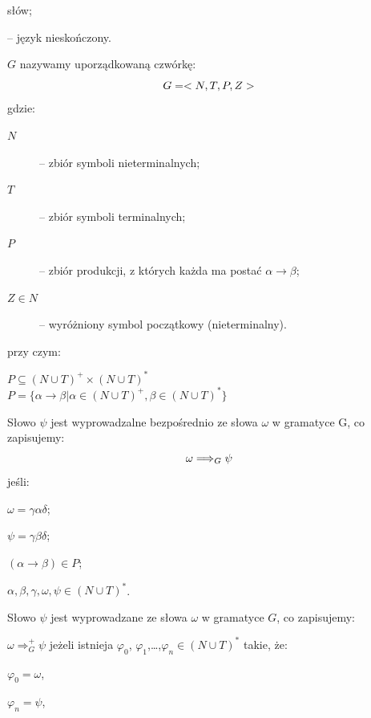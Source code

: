 \begin{description}
\begin{description}
  słów;
   \item[$L_4 = \{0, 01, 011, \ldots\} = \{01^n | n \ge 0\}$]-- język
  nieskończony.
  \end{description}
 \item[Gramatyka] $G$ nazywamy uporządkowaną czwórkę:
  \begin{equation}
  G = <N, T, P, Z>
  \vspace{-10pt}
  \end{equation}
 gdzie:
  \begin{description}
   \item[$N$]-- zbiór symboli nieterminalnych;
   \item[$T$]-- zbiór symboli terminalnych;
   \item[$P$]-- zbiór produkcji, z których każda ma postać
  $\alpha\rightarrow\beta$;
   \item[$Z\in N$]-- wyróżniony symbol początkowy (nieterminalny).
  \end{description}
 przy czym:
  \begin{description}
   \item[$P\subseteq (N\cup T)^+\times(N\cup T)^*$]
   \item[$P=\{\alpha\rightarrow\beta | \alpha\in(N\cup T)^+, \beta\in(N\cup
  T)^*\}$]
  \end{description}
 \item[Wyprowadzalność.] Słowo $\psi$ jest wyprowadzalne bezpośrednio ze słowa
$\omega$ w gramatyce G, co zapisujemy:
  \begin{equation}
  \omega \Longrightarrow_G \psi
  \vspace{-10pt}
  \end{equation}
jeśli:
  \begin{description}
   \item $\omega = \gamma\alpha\delta$;
   \item $\psi = \gamma\beta\delta$;
   \item $(\alpha\rightarrow\beta)\in P$;
   \item $\alpha,\beta,\gamma,\omega,\psi\in(N\cup T)^*$.
  \end{description}
Słowo $\psi$ jest wyprowadzane ze słowa $\omega$ w gramatyce $G$, co zapisujemy:
  \begin{description}
   \item $\omega \Longrightarrow_G^+\psi$
jeżeli istnieja $\varphi_0$, $\varphi_1$,\ldots,$\varphi_n\in(N\cup T)^*$
takie, że:
   \item $\varphi_0 = \omega$,
   \item $\varphi_n = \psi$,

\end{description}
\end{description}
